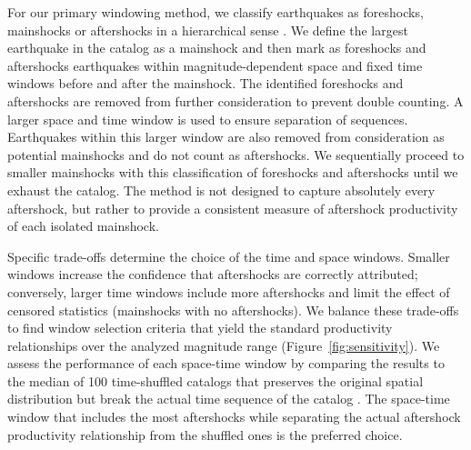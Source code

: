 \documentclass[draft, jgrga]{agujournal2018}
\begin{document}
For our primary windowing method, we classify earthquakes as foreshocks, mainshocks or aftershocks in a hierarchical sense \citep[following][]{felzer2006decay, Brodsky2011TheForeshocks, Wetzler2016, Garza-Giron2018Mainshock-AftershockRegions}. We define the largest earthquake in the catalog as a mainshock and then mark as foreshocks and aftershocks earthquakes within magnitude-dependent space and fixed time windows before and after the mainshock. The identified foreshocks and aftershocks are removed from further consideration to prevent double counting. A larger space and time window is used to ensure separation of sequences. Earthquakes within this larger window are also removed from consideration as potential mainshocks and do not count as aftershocks. We sequentially proceed to smaller mainshocks with this classification of foreshocks and aftershocks until we exhaust the catalog. The method is not designed to capture absolutely every aftershock, but rather to provide a consistent measure of aftershock productivity of each isolated mainshock.   

Specific trade-offs determine the choice of the time and space windows. Smaller windows increase the confidence that aftershocks are correctly attributed; conversely, larger time windows include more aftershocks and limit the effect of censored statistics (mainshocks with no aftershocks). We balance these trade-offs to find window selection criteria that yield the standard productivity relationships over the analyzed magnitude range (Figure~\ref{fig:sensitivity}). We assess the performance of each space-time window by comparing the results to the median of 100 time-shuffled catalogs that preserves the original spatial distribution but break the actual time sequence of the catalog \citep{Garza-Giron2018Mainshock-AftershockRegions}. The space-time window that includes the most aftershocks while separating the actual aftershock productivity relationship from the shuffled ones is the preferred choice.
  
\end{document}
